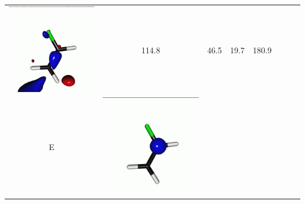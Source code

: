 \documentclass[journal=jctcce,manuscript=article]{achemso}
\begin{document}
\begin{table}[H]
\begin{tabular}{ c | c c c | c c c c}
\begin{minipage}{0.2\textwidth}
         \includegraphics[scale=0.10]{NTO/CH2CHF/8p_019.png}
     \end{minipage}
     & 114.8 & 46.5 & 19.7 & 180.9
     \\
                  E &  
     \begin{minipage}{0.2\textwidth}
         \centering
         \includegraphics[scale=0.10]{NTO/CH2CHF/11h.png}

\end{minipage}
\end{tabular}
\end{table}
\end{document}
